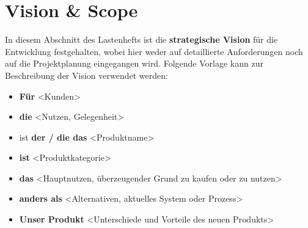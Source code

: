 \section{Vision \& Scope}


\begin{tcolorbox}[title={Vision & Scope - Vision der Lösung}]

In diesem Abschnitt des Lastenhefts ist die \textbf{strategische Vision} für die Entwicklung festgehalten, wobei hier weder auf  detaillierte Anforderungen noch auf die Projektplanung eingegangen wird.
Folgende Vorlage kann zur Beschreibung der Vision verwendet werden:
\begin{itemize}
    \item \textbf{Für} <Kunden>
    \item \textbf{die} <Nutzen, Gelegenheit>
    \item ist \textbf{der / die das} <Produktname>
    \item \textbf{ist} <Produktkategorie>
    \item \textbf{das} <Hauptnutzen, überzeugender Grund zu kaufen oder zu nutzen>
    \item \textbf{anders als} <Alternativen, aktuelles System oder Prozess>
    \item \textbf{Unser Produkt} <Unterschiede und Vorteile des neuen Produkts>
\end{itemize}
\end{tcolorbox}